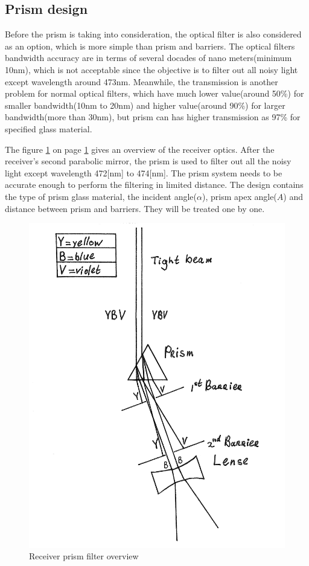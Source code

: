 \subsection{Prism design}
\label{prism}
Before the prism is taking into consideration, the optical filter is also considered as an option, which is more simple than prism and barriers. The optical filters bandwidth accuracy are in terms of several docades of nano meters(minimum 10nm\cite{optical_filter}), which is not acceptable since the objective is to filter out all noisy light except wavelength around 473nm. Meanwhile, the transmission is another problem for normal optical filters, which have much lower value(around 50\%) for smaller bandwidth(10nm to 20nm) and higher value(around 90\%) for larger bandwidth(more than 30nm), but prism can has higher transmission as 97\% for specified glass material.

The figure \ref{fig:prism} on page \ref{fig:prism} gives an overview of the receiver optics. After the receiver's second parabolic mirror, the prism is used to filter out all the noisy light except wavelength 472[nm] to 474[nm]. The prism system needs to be accurate enough to perform the filtering in limited distance. The design contains the type of prism glass material, the incident angle($\alpha$), prism apex angle($A$) and distance between prism and barriers. They will be treated one by one.

\begin{figure}[ht!]
\centering
\includegraphics[scale = 0.8]{chapters/img/Prism.png}
\caption{Receiver prism filter overview}
\label{fig:prism}
\end{figure} 


